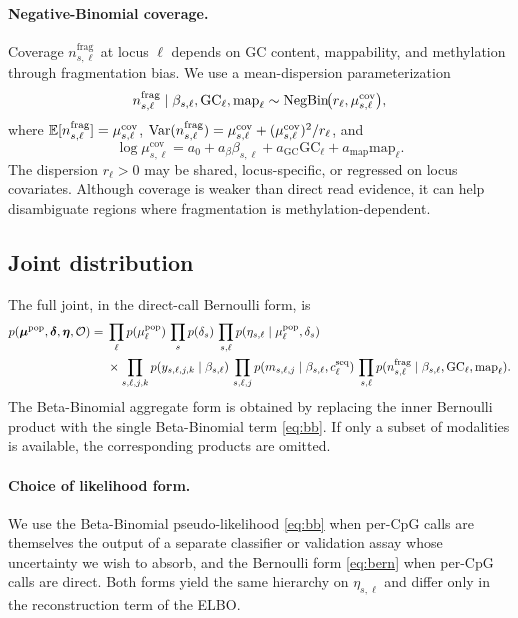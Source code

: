 \paragraph{Negative-Binomial coverage.} Coverage $n^{\mathrm{frag}}_{s,\ell}$ at locus $\ell$ depends on GC content, mappability, and methylation through fragmentation bias. We use a mean-dispersion parameterization
\begin{equation}
n^{\mathrm{frag}}_{s,\ell}\mid \beta_{s,\ell}, \mathrm{GC}_\ell, \mathrm{map}_\ell \sim \mathrm{NegBin}\!\big(r_\ell,\mu_{s,\ell}^{\mathrm{cov}}\big),
\label{eq:nb}
\end{equation}
where $\mathbb{E}[n^{\mathrm{frag}}_{s,\ell}]=\mu_{s,\ell}^{\mathrm{cov}}$, $\mathrm{Var}(n^{\mathrm{frag}}_{s,\ell})=\mu_{s,\ell}^{\mathrm{cov}}+(\mu_{s,\ell}^{\mathrm{cov}})^2/r_\ell$, and
\begin{equation}
\log\mu_{s,\ell}^{\mathrm{cov}}=a_0+a_\beta\beta_{s,\ell}+a_{\mathrm{GC}}\mathrm{GC}_\ell+a_{\mathrm{map}}\mathrm{map}_\ell.
\end{equation}
The dispersion $r_\ell>0$ may be shared, locus-specific, or regressed on locus covariates. Although coverage is weaker than direct read evidence, it can help disambiguate regions where fragmentation is methylation-dependent.

\subsection{Joint distribution}
The full joint, in the direct-call Bernoulli form, is
\begin{align}
p(\bm{\mu}^{\mathrm{pop}},\boldsymbol{\delta},\bm\eta,\mathcal{O})
=\;& \prod_\ell p(\mu^{\mathrm{pop}}_\ell)\,
     \prod_s p(\delta_s)\,
     \prod_{s,\ell} p(\eta_{s,\ell}\mid\mu^{\mathrm{pop}}_\ell,\delta_s)\nonumber\\
&\times\prod_{s,\ell,j,k} p(y_{s,\ell,j,k}\mid\beta_{s,\ell})\,
   \prod_{s,\ell,j} p(m_{s,\ell,j}\mid\beta_{s,\ell}, c^{\mathrm{seq}}_\ell)\,
   \prod_{s,\ell} p(n^{\mathrm{frag}}_{s,\ell}\mid\beta_{s,\ell}, \mathrm{GC}_\ell,\mathrm{map}_\ell).
\label{eq:joint}
\end{align}
The Beta-Binomial aggregate form is obtained by replacing the inner Bernoulli product with the single Beta-Binomial term \eqref{eq:bb}. If only a subset of modalities is available, the corresponding products are omitted.

\paragraph{Choice of likelihood form.} We use the Beta-Binomial pseudo-likelihood \eqref{eq:bb} when per-CpG calls are themselves the output of a separate classifier or validation assay whose uncertainty we wish to absorb, and the Bernoulli form \eqref{eq:bern} when per-CpG calls are direct. Both forms yield the same hierarchy on $\eta_{s,\ell}$ and differ only in the reconstruction term of the ELBO.

